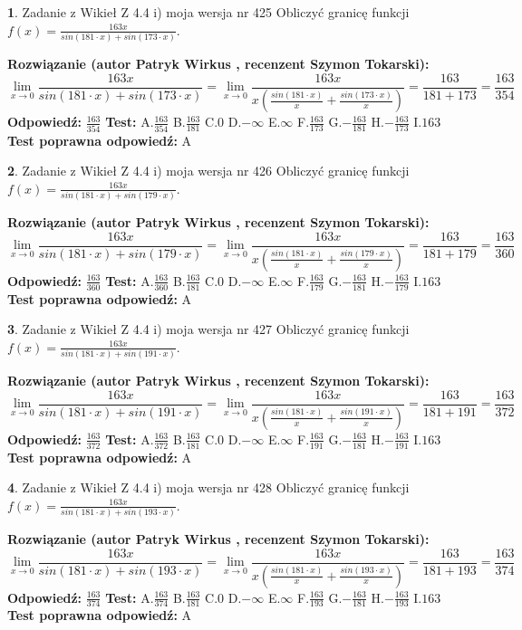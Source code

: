 \documentclass[12pt, a4paper]{article}
\theoremstyle{definition} %
\newtheorem{zad}{}
\newcommand{\zadStart}[1]{\begin{zad}#1\newline}
\newcommand{\zadStop}{\end{zad}}
\newcommand{\rozwStart}[2]{\noindent \textbf{Rozwiązanie (autor #1 , recenzent #2): }\newline}
\newcommand{\rozwStop}{\newline}
\newcommand{\odpStart}{\noindent \textbf{Odpowiedź:}\newline}
\newcommand{\odpStop}{\newline}
\newcommand{\testStart}{\noindent \textbf{Test:}\newline}
\newcommand{\testStop}{\newline}
\newcommand{\kluczStart}{\noindent \textbf{Test poprawna odpowiedź:}\newline}
\newcommand{\kluczStop}{\newline}
\begin{document}
\zadStart{Zadanie z Wikieł Z 4.4 i) moja wersja nr 425}
Obliczyć granicę funkcji $f(x)=\frac{163x}{sin(181\cdot x) +sin(173\cdot x)}$.
\zadStop
\rozwStart{Patryk Wirkus}{Szymon Tokarski}
$$\lim\limits_{x\to 0}\frac{163x}{sin(181\cdot x) +sin(173\cdot x)}=\lim\limits_{x\to 0}\frac{163x}{x(\frac{sin(181\cdot x)}{x}+\frac{sin(173\cdot x)}{x})}=\frac{163}{181+173} = \frac{163}{354}$$
\rozwStop
\odpStart
$\frac{163}{354}$
\odpStop
\testStart
A.$\frac{163}{354}$
B.$\frac{163}{181}$
C.$0$
D.$-\infty$
E.$\infty$
F.$\frac{163}{173}$
G.$-\frac{163}{181}$
H.$-\frac{163}{173}$
I.$163$
\testStop
\kluczStart
A
\kluczStop



\zadStart{Zadanie z Wikieł Z 4.4 i) moja wersja nr 426}
Obliczyć granicę funkcji $f(x)=\frac{163x}{sin(181\cdot x) +sin(179\cdot x)}$.
\zadStop
\rozwStart{Patryk Wirkus}{Szymon Tokarski}
$$\lim\limits_{x\to 0}\frac{163x}{sin(181\cdot x) +sin(179\cdot x)}=\lim\limits_{x\to 0}\frac{163x}{x(\frac{sin(181\cdot x)}{x}+\frac{sin(179\cdot x)}{x})}=\frac{163}{181+179} = \frac{163}{360}$$
\rozwStop
\odpStart
$\frac{163}{360}$
\odpStop
\testStart
A.$\frac{163}{360}$
B.$\frac{163}{181}$
C.$0$
D.$-\infty$
E.$\infty$
F.$\frac{163}{179}$
G.$-\frac{163}{181}$
H.$-\frac{163}{179}$
I.$163$
\testStop
\kluczStart
A
\kluczStop



\zadStart{Zadanie z Wikieł Z 4.4 i) moja wersja nr 427}
Obliczyć granicę funkcji $f(x)=\frac{163x}{sin(181\cdot x) +sin(191\cdot x)}$.
\zadStop
\rozwStart{Patryk Wirkus}{Szymon Tokarski}
$$\lim\limits_{x\to 0}\frac{163x}{sin(181\cdot x) +sin(191\cdot x)}=\lim\limits_{x\to 0}\frac{163x}{x(\frac{sin(181\cdot x)}{x}+\frac{sin(191\cdot x)}{x})}=\frac{163}{181+191} = \frac{163}{372}$$
\rozwStop
\odpStart
$\frac{163}{372}$
\odpStop
\testStart
A.$\frac{163}{372}$
B.$\frac{163}{181}$
C.$0$
D.$-\infty$
E.$\infty$
F.$\frac{163}{191}$
G.$-\frac{163}{181}$
H.$-\frac{163}{191}$
I.$163$
\testStop
\kluczStart
A
\kluczStop



\zadStart{Zadanie z Wikieł Z 4.4 i) moja wersja nr 428}
Obliczyć granicę funkcji $f(x)=\frac{163x}{sin(181\cdot x) +sin(193\cdot x)}$.
\zadStop
\rozwStart{Patryk Wirkus}{Szymon Tokarski}
$$\lim\limits_{x\to 0}\frac{163x}{sin(181\cdot x) +sin(193\cdot x)}=\lim\limits_{x\to 0}\frac{163x}{x(\frac{sin(181\cdot x)}{x}+\frac{sin(193\cdot x)}{x})}=\frac{163}{181+193} = \frac{163}{374}$$
\rozwStop
\odpStart
$\frac{163}{374}$
\odpStop
\testStart
A.$\frac{163}{374}$
B.$\frac{163}{181}$
C.$0$
D.$-\infty$
E.$\infty$
F.$\frac{163}{193}$
G.$-\frac{163}{181}$
H.$-\frac{163}{193}$
I.$163$
\testStop
\kluczStart
A
\kluczStop
\end{document}
